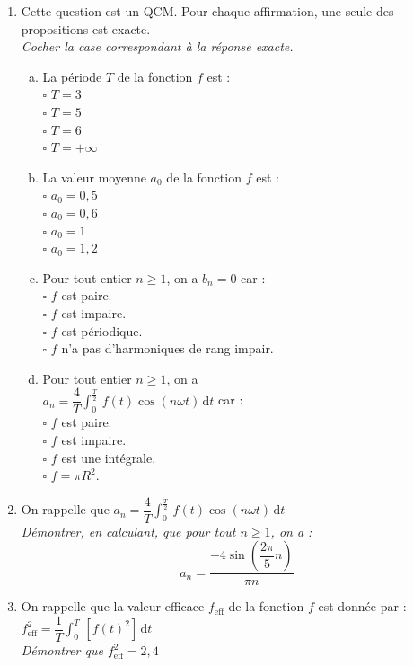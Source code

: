 \documentclass[a4paper,11pt]{article}
\begin{document}
\begin{enumerate}
\item Cette question est un QCM. Pour chaque affirmation, une seule des propositions est exacte. \\ 
\emph{Cocher la case correspondant à la réponse exacte.}
\begin{multicols}{2}
	\begin{enumerate}[a)]
	\item La période $T$ de la fonction $f$ est :\\
		$\square$ $T=3$\\
		$\square$ $T=5$\\
		$\square$ $T=6$\\
		$\square$ $T=+\infty$\\
	\item La valeur moyenne $a_0$ de la fonction $f$ est :\\
		$\square$ $a_0=0,\!5$\\
		$\square$ $a_0=0,\!6$\\
		$\square$ $a_0=1$\\
		$\square$ $a_0=1,\!2$\\
		\vspace{3cm}
	\item Pour tout entier $n\geq1$, on a $b_n=0$ car :\\
		$\square$ $f$ est paire.\\
		$\square$ $f$ est impaire.\\
		$\square$ $f$ est périodique.\\
		$\square$ $f$ n'a pas d'harmoniques de rang impair.\\
	\item Pour tout entier $n\geq1$, on a\\ $a_n=\dfrac{4}{T}\int_0^\frac{T}{2}\,f(t)\cos(n\omega t)\,\textrm{d}t$ car :\\
		$\square$ $f$ est paire.\\
		$\square$ $f$ est impaire.\\
		$\square$ $f$ est une intégrale.\\
		$\square$ $f=\pi R^2$.\\
	\end{enumerate}
\end{multicols}
	\item On rappelle que $a_n=\dfrac{4}{T}\int_0^\frac{T}{2}\,f(t)\cos(n\omega t)\,\textrm{d}t$\\
	\emph{Démontrer, en calculant, que pour tout $n\geq1$, on a :}
	$$a_n=\dfrac{-4\sin\left(\dfrac{2\pi}{5}n\right)}{\pi n}$$
	\item On rappelle que la valeur efficace $f_{\textrm{eff}}$ de la fonction $f$ est donnée par : $f_{\textrm{eff}}^2=\dfrac{1}{T}\displaystyle\int_0^T \,\left[f(t)^2\right]\,\textrm{d}t$\\
	\emph{Démontrer que $f_{\textrm{eff}}^2=2,\!4$}\\


\end{enumerate}
\end{document}
